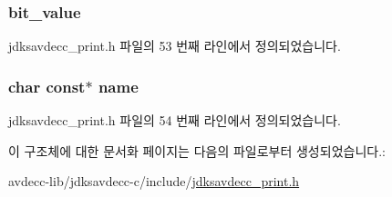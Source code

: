 \subsubsection[{\texorpdfstring{bit\+\_\+value}{bit_value}}]{ bit\+\_\+value}\hypertarget{structjdksavdecc__32bit__name_ae9a111dd43e7e9ba42244f521baa5e77}{}\label{structjdksavdecc__32bit__name_ae9a111dd43e7e9ba42244f521baa5e77}


jdksavdecc\+\_\+print.\+h 파일의 53 번째 라인에서 정의되었습니다.

\subsubsection[{\texorpdfstring{name}{name}}]{\setlength{\rightskip}{0pt plus 5cm}char const$\ast$ name}\hypertarget{structjdksavdecc__32bit__name_a5f1de76dd5d451949e12c0fbc966ca70}{}\label{structjdksavdecc__32bit__name_a5f1de76dd5d451949e12c0fbc966ca70}


jdksavdecc\+\_\+print.\+h 파일의 54 번째 라인에서 정의되었습니다.



이 구조체에 대한 문서화 페이지는 다음의 파일로부터 생성되었습니다.\+:\begin{DoxyCompactItemize}
\item 
avdecc-\/lib/jdksavdecc-\/c/include/\hyperlink{jdksavdecc__print_8h}{jdksavdecc\+\_\+print.\+h}\end{DoxyCompactItemize}
